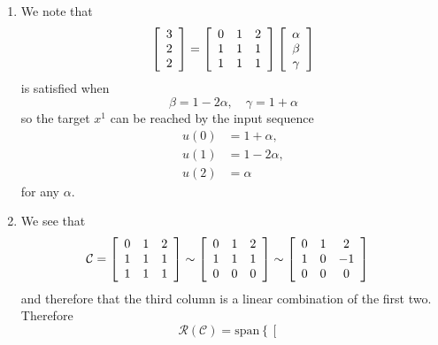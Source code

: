 \documentclass{article}
\begin{document}
\begin{enumerate}
  \item{
    We note that
    $$
    \left[\begin{array}{c}
      3 \\ 2 \\ 2
    \end{array}\right]
    =
    \left[\begin{array}{c c c}
      0 & 1 & 2 \\
      1 & 1 & 1 \\
      1 & 1 & 1
    \end{array}\right]
    \left[\begin{array}{c}
      \alpha \\ \beta \\ \gamma
    \end{array}\right]
    $$
    is satisfied when
    $$
    \beta = 1 - 2\alpha, \quad \gamma = 1 + \alpha
    $$
    so the target $x^1$ can be reached by the input sequence
    \begin{align*}
    u(0) &= 1 + \alpha, \\
    u(1) &= 1 - 2\alpha, \\
    u(2) &= \alpha
    \end{align*}
    for any $\alpha$.
  }
  \item{
    We see that
    \begin{align*}
      \mathcal{C} &= 
      \left[\begin{array}{c c c}
        0 & 1 & 2 \\
        1 & 1 & 1 \\
        1 & 1 & 1
      \end{array}\right]
      \sim
      \left[\begin{array}{c c c}
        0 & 1 & 2 \\
        1 & 1 & 1 \\
        0 & 0 & 0
      \end{array}\right]
      \sim
      \left[\begin{array}{c c c}
        0 & 1 &  2 \\
        1 & 0 & -1 \\
        0 & 0 &  0
      \end{array}\right]
    \end{align*}
    and therefore that the third column is a linear combination of the
    first two. Therefore
    $$
    \mathcal{R}(\mathcal{C}) = \mathrm{span}\left\{
      \left[\begin{array}{c}

\end{array}$$}
\end{enumerate}
\end{document}
